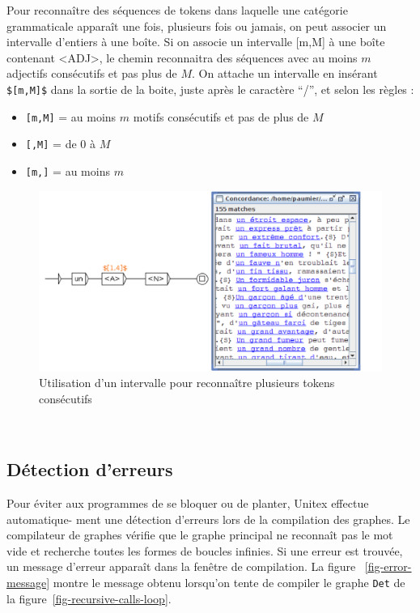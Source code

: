 \pagebreak
{}
\noindent Pour reconnaître des séquences de tokens dans laquelle une catégorie grammaticale apparaît une fois, plusieurs fois ou jamais, on peut associer un intervalle d'entiers à une boîte.
Si on associe un intervalle  [m,M]  à une boîte contenant <ADJ>, le chemin reconnaitra des séquences avec au moins $m$ adjectifs consécutifs et pas plus de $M$.
On attache un intervalle en insérant \verb+$[m,M]$+ dans la sortie de la boite, juste après le caractère ``/'', et selon les règles : 
\begin{itemize}
\item \verb+[m,M]+ = au moins $m$ motifs consécutifs et pas de plus de $M$
\item \verb+[,M]+ = de 0 à $M$  
\item \verb+[m,]+ = au moins $m$
\end{itemize}

\begin{figure}[h!]
\begin{center}
\includegraphics[width=13.5cm]{resources/img/fig6-10a.png}
\caption{Utilisation d'un intervalle pour reconnaître plusieurs tokens consécutifs\label{intervals}}
\end{center}
\end{figure}

\
\subsection{Détection d’erreurs}
\index{Erreurs dans les graphes}
Pour éviter aux programmes de se bloquer ou de planter, Unitex effectue automatique-
ment une détection d’erreurs lors de la compilation des graphes. Le compilateur de graphes
vérifie que le graphe principal ne reconnaît pas le mot vide et recherche toutes les formes de
boucles infinies. Si une erreur est trouvée, un message d’erreur apparaît dans la fenêtre de
compilation. La figure ~\ref{fig-error-message} montre le message obtenu lorsqu’on tente de 
compiler le graphe \verb+Det+ de la figure~\ref{fig-recursive-calls-loop}.

